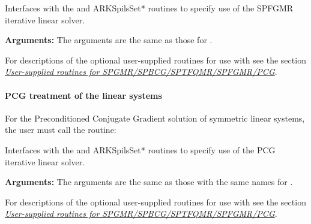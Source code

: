 \documentclass[letterpaper,10pt,english]{sphinxmanual}
\begin{document}
\begin{fulllineitems}
\label{f_interface/Usage:f/_/FARKSPFGMR}
Interfaces with the {\hyperref[c_interface/User_callable:ARKSpfgmr]{}} and
ARKSpilsSet* routines to specify use of the SPFGMR iterative
linear solver.

\textbf{Arguments:}  The arguments are the same as those for
{\hyperref[f_interface/Usage:f/_/FARKSPGMR]{}}.

\end{fulllineitems}


For descriptions of the optional user-supplied routines for use with
{\hyperref[f_interface/Usage:f/_/FARKSPFGMR]{}} see the section {\hyperref[f_interface/Usage:finterface-spilsusersupplied]{\emph{User-supplied routines for SPGMR/SPBCG/SPTFQMR/SPFGMR/PCG}}}.


\paragraph{PCG treatment of the linear systems}
\label{f_interface/Usage:pcg-treatment-of-the-linear-systems}
For the Preconditioned Conjugate Gradient solution of symmetric linear
systems, the user must call the {\hyperref[f_interface/Usage:f/_/FARKPCG]{}} routine:

\begin{fulllineitems}
\label{f_interface/Usage:f/_/FARKPCG}
Interfaces with the {\hyperref[c_interface/User_callable:ARKPcg]{}} and
ARKSpilsSet* routines to specify use of the PCG iterative
linear solver.

\textbf{Arguments:}  The arguments are the same as those with the
same names for {\hyperref[f_interface/Usage:f/_/FARKSPGMR]{}}.

\end{fulllineitems}


For descriptions of the optional user-supplied routines for use with
{\hyperref[f_interface/Usage:f/_/FARKPCG]{}} see the section {\hyperref[f_interface/Usage:finterface-spilsusersupplied]{\emph{User-supplied routines for SPGMR/SPBCG/SPTFQMR/SPFGMR/PCG}}}.
\end{document}
